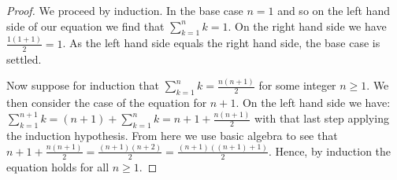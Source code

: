 \documentclass[12pt]{article}
\begin{document}
\begin{proof}
We proceed by induction.  In the base case $n=1$ and so on the left hand side of our equation we find that
$\sum_{k=1}^n k=1$.  On the right hand side we have $\frac{1(1+1)}{2}=1$.  As the left hand side equals
the right hand side, the base case is settled.

Now suppose for induction that $\sum_{k=1}^n k = \frac{n(n+1)}{2}$ for some integer $n\geq 1$.
We then consider the case of the equation for $n+1$.  On the left hand side we have:
$\sum_{k=1}^{n+1} k= (n+1)+\sum_{k=1}^n k=n+1+\frac{n(n+1)}{2}$ with that last step applying
the induction hypothesis.  From here we use basic algebra to see that 
$n+1+\frac{n(n+1)}{2}=\frac{(n+1)(n+2)}{2}=\frac{(n+1)((n+1)+1)}{2}$.  Hence, by induction the
equation holds for all $n\geq 1$.
\end{proof}

\end{document}
